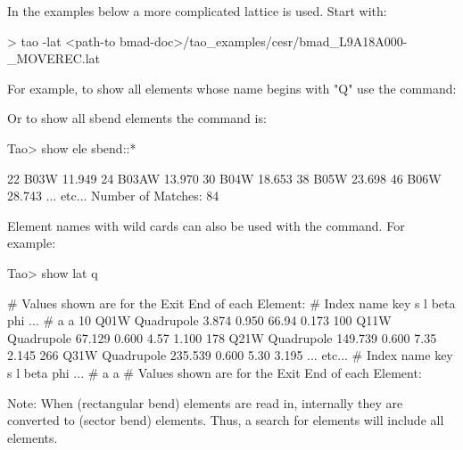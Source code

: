 \documentclass{hitec}     %
\begin{document}
In the examples below a more complicated lattice is used. Start \tao with:
\begin{code}
  > tao -lat <path-to bmad-doc>/tao_examples/cesr/bmad_L9A18A000-_MOVEREC.lat
\end{code}
For example, to show all elements whose name begins with "Q" use the  command:

Or to show all sbend elements the command is:
\begin{code}  
Tao> show ele sbend::*

        22  B03W                                            11.949
        24  B03AW                                           13.970
        30  B04W                                            18.653
        38  B05W                                            23.698
        46  B06W                                            28.743
... etc...
Number of Matches: 84
\end{code}

Element names with wild cards can also be used with the  command. For example:
\begin{code}
Tao> show lat q%

# Values shown are for the Exit End of each Element:
# Index  name   key                   s       l    beta     phi ...  
#                                                     a       a
    10  Q01W Quadrupole            3.874   0.950   66.94   0.173  
   100  Q11W Quadrupole           67.129   0.600    4.57   1.100  
   178  Q21W Quadrupole          149.739   0.600    7.35   2.145  
   266  Q31W Quadrupole          235.539   0.600    5.30   3.195  
   ... etc...
# Index  name   key                   s       l    beta     phi ...  
#                                                     a       a
# Values shown are for the Exit End of each Element:
\end{code}

Note: When  (rectangular bend) elements are read in, internally they are converted to
 (sector bend) elements. Thus, a search for  elements will include all
 elements.
\end{document}
